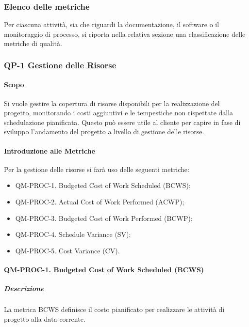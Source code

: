 	\subsubsection{Elenco delle metriche} 

	Per ciascuna attività, sia che riguardi la documentazione, il software o il monitoraggio di processo, si riporta nella relativa sezione una classificazione delle metriche di qualità.

	\subsubsection{QP-1 Gestione delle Risorse}

		\paragraph{Scopo}

		Si vuole gestire la copertura di risorse disponibili per la realizzazione del progetto, monitorando i costi aggiuntivi e le tempestiche non rispettate dalla schedulazione pianificata. Questo può essere utile al cliente per capire in fase di sviluppo l'andamento del progetto a livello di gestione delle risorse.

		\paragraph{Introduzione alle Metriche}

		Per la gestione delle risorse si farà uso delle seguenti metriche:

		\begin{itemize}
			\item QM-PROC-1. Budgeted Cost of Work Scheduled (BCWS);
			\item QM-PROC-2. Actual Cost of Work Performed (ACWP);
			\item QM-PROC-3. Budgeted Cost of Work Performed (BCWP);
			\item QM-PROC-4. Schedule Variance (SV);
			\item QM-PROC-5. Cost Variance (CV).
		\end{itemize}

		\paragraph{QM-PROC-1. Budgeted Cost of Work Scheduled (BCWS)}

			\subparagraph{Descrizione}
			La metrica BCWS definisce il costo pianificato per realizzare le attività di progetto alla data corrente.

